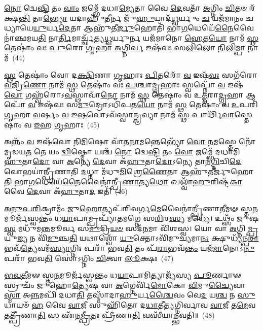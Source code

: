 \-\ul{𑌨𑍋} 𑌦𑍍𑌵𑍇\-\ul{𑌷𑍍𑌟𑌿} 𑌤𑌂 \ul{𑌵𑌾𑌂} 𑌜𑌮𑍍𑌭𑍇᳴ 𑌦𑌧𑌾\-\ul{𑌮𑍍𑌯𑍇}\-𑌤𑌾 𑌵𑍈 \ul{𑌦𑍇}\-𑌵𑌤𑌾᳴ \ul{𑌅}\-𑌗𑍍𑌨𑌿𑌂 \ul{𑌚𑌿}\-𑌤𑍞 𑌰᳴𑌕𑍍𑌷\-\ul{𑌨𑍍𑌤𑌿} 𑌤𑌾\-\ul{𑌭𑍍𑌯𑍋} 𑌯𑌦𑌾𑌹𑍁᳴\-\ul{𑌤𑍀}\-𑌰𑍍𑌨 𑌜𑍁᳴\-\ul{𑌹𑍁}\-𑌯𑌾𑌦᳴\-\ul{𑌧𑍍𑌵}\-𑌰𑍍𑌯𑍁𑌂 \ul{𑌚} 𑌯𑌜᳴𑌮𑌾𑌨𑌂 𑌚 𑌧𑍍𑌯𑌾𑌯𑍇\-\ul{𑌯𑍁}\-𑌰𑍍𑌯\-\ul{𑌦𑍇}\-𑌤𑌾 𑌆𑌹𑍁᳴𑌤𑍀\-\ul{𑌰𑍍𑌜𑍁}\-𑌹𑍋𑌤𑌿᳴ 𑌭𑌾\-\ul{𑌗}\-𑌧𑍇𑌯𑍇᳴\-\ul{𑌨𑍈}\-𑌵𑍈𑌨𑌾॑𑌞𑍍𑌛𑌮𑌯\-\ul{𑌤𑌿} 𑌨𑌾\-\ul{𑌰𑍍𑌤𑌿}\-𑌮𑌾𑌰𑍍𑌚𑍍𑌛᳴𑌤𑍍𑌯\-\ul{𑌧𑍍𑌵}\-𑌰𑍍𑌯𑍁𑌰𑍍𑌨 𑌯𑌜᳴𑌮𑌾𑌨𑍋 \ul{𑌹𑍇}\-𑌤\-\ul{𑌯𑍋} 𑌨𑌾𑌮᳴ \ul{𑌸𑍍𑌥} 𑌤𑍇𑌷𑌾𑌂॑ 𑌵𑌃 \ul{𑌪𑍁}\-𑌰𑍋 \ul{𑌗𑍃}\-𑌹𑌾 \ul{𑌅}\-𑌗𑍍𑌨𑌿\-\ul{𑌰𑍍𑌵} 𑌇𑌷᳴𑌵𑌃 𑌸\-\ul{𑌲𑌿}\-𑌲𑍋 𑌨𑌿\-\ul{𑌲𑌿}\-𑌮𑍍𑌪𑌾 𑌨𑌾𑌮᳴~(44)

\-\ul{𑌸𑍍𑌥} 𑌤𑍇𑌷𑌾𑌂॑ 𑌵𑍋 𑌦\-\ul{𑌕𑍍𑌷𑌿}\-𑌣𑌾 \ul{𑌗𑍃}\-𑌹𑌾𑌃 \ul{𑌪𑌿}\-𑌤𑌰𑍋᳴ \ul{𑌵} 𑌇𑌷᳴\-\ul{𑌵𑌃} 𑌸𑌗᳴𑌰𑍋 \ul{𑌵}\-𑌜𑍍𑌰𑌿\-\ul{𑌣𑍋} 𑌨𑌾𑌮᳴ \ul{𑌸𑍍𑌥} 𑌤𑍇𑌷𑌾𑌂॑ 𑌵𑌃 \ul{𑌪}\-𑌶𑍍𑌚𑌾\-\ul{𑌦𑍍𑌗𑍃}\-𑌹𑌾𑌃 𑌸𑍍𑌵𑌪𑍍𑌨𑍋᳴ \ul{𑌵} 𑌇𑌷᳴\-\ul{𑌵𑍋} 𑌗𑌹𑍍𑌵᳴𑌰𑍋\-𑌽\-\ul{𑌵}\-𑌸𑍍𑌥𑌾𑌵𑌾᳴\-\ul{𑌨𑍋} 𑌨𑌾𑌮᳴ \ul{𑌸𑍍𑌥} 𑌤𑍇𑌷𑌾𑌂॑ 𑌵 𑌉\-\ul{𑌤𑍍𑌤}\-𑌰𑌾\-\ul{𑌦𑍍𑌗𑍃}\-𑌹𑌾 𑌆𑌪𑍋᳴ \ul{𑌵} 𑌇𑌷᳴𑌵𑌃 𑌸\-\ul{𑌮𑍁}\-𑌦𑍍𑌰𑍋\-𑌽𑌧𑌿᳴𑌪𑌤\-\ul{𑌯𑍋} 𑌨𑌾𑌮᳴ \ul{𑌸𑍍𑌥} 𑌤𑍇𑌷𑌾𑌂॑ 𑌵 \ul{𑌉}\-𑌪𑌰𑌿᳴ \ul{𑌗𑍃}\-𑌹𑌾 \ul{𑌵}\-𑌰𑍍\mbox{}𑌷𑌂 \ul{𑌵} 𑌇\-\ul{𑌷}\-𑌵𑍋\-𑌽𑌵᳴𑌸𑍍𑌵𑌾\-\ul{𑌨𑍍𑌕𑍍𑌰}\-𑌵𑍍𑌯𑌾 𑌨𑌾𑌮᳴ \ul{𑌸𑍍𑌥} 𑌪𑌾𑌰𑍍𑌥𑌿᳴\-\ul{𑌵𑌾}\-𑌸𑍍𑌤𑍇𑌷𑌾𑌂॑ 𑌵 \ul{𑌇}\-𑌹 \ul{𑌗𑍃}\-𑌹𑌾𑌃~(45)

𑌅𑌨𑍍𑌨𑌂᳴ \ul{𑌵} 𑌇𑌷᳴𑌵𑍋 𑌨𑌿\-\ul{𑌮𑌿}\-𑌷𑍋 𑌵𑌾᳴𑌤\-\ul{𑌨𑌾}\-𑌮𑌨𑍍𑌤𑍇𑌭𑍍𑌯𑍋᳴ \ul{𑌵𑍋} 𑌨\-\ul{𑌮}\-𑌸𑍍𑌤𑍇 𑌨𑍋᳴ 𑌮𑍃𑌡𑌯\-\ul{𑌤} 𑌤𑍇 𑌯𑌂 \ul{𑌦𑍍𑌵𑌿}\-𑌷𑍍𑌮𑍋 𑌯𑌶𑍍𑌚᳴ \ul{𑌨𑍋} 𑌦𑍍𑌵𑍇\-\ul{𑌷𑍍𑌟𑌿} 𑌤𑌂 \ul{𑌵𑍋} 𑌜𑌮𑍍𑌭𑍇᳴ 𑌦𑌧𑌾𑌮𑌿 \ul{𑌹𑍁}\-𑌤𑌾\-\ul{𑌦𑍋} 𑌵𑌾 \ul{𑌅}\-𑌨𑍍𑌯𑍇 \ul{𑌦𑍇}\-𑌵𑌾 𑌅᳴\-\ul{𑌹𑍁}\-𑌤𑌾\-\ul{𑌦𑍋}\-\-𑌽𑌨𑍍𑌯𑍇 𑌤𑌾𑌨᳴\-\ul{𑌗𑍍𑌨𑌿}\-𑌚𑌿\-\ul{𑌦𑍇}\-𑌵𑍋𑌭𑌯𑌾॑𑌨𑍍𑌪𑍍𑌰𑍀𑌣𑌾𑌤𑌿 \ul{𑌦}\-𑌧𑍍𑌨𑌾 𑌮᳴𑌧𑍁\-\ul{𑌮𑌿}\-𑌶𑍍𑌰𑍇\-\ul{𑌣𑍈}\-𑌤𑌾 𑌆𑌹𑍁᳴𑌤𑍀𑌰𑍍𑌜𑍁𑌹𑍋𑌤𑌿 𑌭𑌾\-\ul{𑌗}\-𑌧𑍇𑌯𑍇᳴\-\ul{𑌨𑍈}\-𑌵𑍈𑌨𑌾॑𑌨𑍍𑌪𑍍𑌰𑍀\-\ul{𑌣𑌾}\-𑌤𑍍𑌯\-\ul{𑌥𑍋} 𑌖𑌲𑍍𑌵𑌾᳴\-\ul{𑌹𑍁}\-𑌰𑌿𑌷𑍍𑌟᳴\-\ul{𑌕𑌾} 𑌵𑍈 \ul{𑌦𑍇}\-𑌵𑌾 𑌅᳴\-\ul{𑌹𑍁}\-𑌤𑌾\-\ul{𑌦} 𑌇𑌤𑌿᳴~(46)

\-\ul{𑌅}\-\-\ul{𑌨𑍁}\-\-\ul{𑌪}\-\-\ul{𑌰𑌿}\-𑌕𑍍𑌰𑌾𑌮𑌂᳴ 𑌜𑍁\-\ul{𑌹𑍋}\-𑌤𑍍𑌯𑌪᳴𑌰𑌿𑌵𑌰𑍍𑌗\-\ul{𑌮𑍇}\-𑌵𑍈𑌨𑌾॑𑌨𑍍𑌪𑍍𑌰𑍀𑌣𑌾\-\ul{𑌤𑍀}\-𑌮𑍟 𑌸𑍍𑌤\-\ul{𑌨}\-𑌮𑍂𑌰𑍍𑌜᳴𑌸𑍍𑌵𑌨𑍍𑌤𑌂 𑌧\-\ul{𑌯𑌾}\-𑌪𑌾𑌮𑍍𑌪𑍍𑌰𑌪𑍍𑌯𑌾᳴𑌤𑌮𑌗𑍍𑌨𑍇 𑌸\-\ul{𑌰𑌿}\-𑌰\-\ul{𑌸𑍍𑌯} 𑌮𑌧𑍍𑌯𑍇॑। 𑌉𑌥𑍍𑌸𑌂᳴ 𑌜𑍁𑌷\-\ul{𑌸𑍍𑌵} 𑌮𑌧𑍁᳴𑌮𑌨𑍍𑌤𑌮𑍂𑌰𑍍𑌵 𑌸\-\ul{𑌮𑍁}\-𑌦𑍍𑌰𑌿\-\ul{𑌯}\-\-\ul{𑍞} 𑌸𑌦᳴\-\ul{𑌨}\-𑌮𑌾 𑌵𑌿᳴𑌶𑌸𑍍𑌵। 𑌯𑍋 𑌵𑌾 \ul{𑌅}\-𑌗𑍍𑌨𑌿\-\ul{𑌮𑍍𑌪𑍍𑌰}\-𑌯𑍁\-\ul{𑌜𑍍𑌯} 𑌨 𑌵𑌿᳴\-\ul{𑌮𑍁}\-𑌞𑍍𑌚\-\ul{𑌤𑌿} 𑌯𑌥𑌾𑌶𑍍𑌵𑍋᳴ \ul{𑌯𑍁}\-𑌕𑍍𑌤𑍋\-𑌽𑌵𑌿᳴𑌮𑍁𑌚𑍍𑌯𑌮𑌾\-\ul{𑌨𑌃} 𑌕𑍍𑌷𑍁𑌧𑍍𑌯᳴𑌨𑍍𑌪\-\ul{𑌰𑌾}\-𑌭𑌵᳴\-\ul{𑌤𑍍𑌯𑍇}\-𑌵𑌮᳴\-\ul{𑌸𑍍𑌯𑌾}\-𑌗𑍍𑌨𑌿𑌃 𑌪𑌰𑌾᳴ 𑌭𑌵\-\ul{𑌤𑌿} 𑌤𑌂 𑌪᳴\-\ul{𑌰𑌾}\-𑌭𑌵᳴\-\ul{𑌨𑍍𑌤𑌂} 𑌯𑌜᳴\-\ul{𑌮𑌾}\-𑌨𑍋\-𑌽\-\ul{𑌨𑍁} 𑌪𑌰𑌾᳴ 𑌭𑌵\-\ul{𑌤𑌿} 𑌸𑍋॑\-𑌽𑌗𑍍𑌨𑌿𑌂 \ul{𑌚𑌿}\-𑌤𑍍𑌵𑌾 \ul{𑌲𑍂}\-𑌕𑍍𑌷𑌃~(47)

\-\ul{𑌭}\-\-\ul{𑌵}\-\-\ul{𑌤𑍀}\-𑌮𑍟 𑌸𑍍𑌤\-\ul{𑌨}\-𑌮𑍂𑌰𑍍𑌜᳴𑌸𑍍𑌵𑌨𑍍𑌤𑌂 𑌧\-\ul{𑌯𑌾}\-𑌪𑌾𑌮𑌿𑌤𑍍𑌯𑌾𑌜𑍍𑌯᳴𑌸𑍍𑌯 \ul{𑌪𑍂}\-𑌰𑍍𑌣𑌾𑍟 𑌸𑍍𑌰𑍁𑌚𑌂᳴ 𑌜𑍁𑌹𑍋\-\ul{𑌤𑍍𑌯𑍇}\-𑌷 𑌵𑌾 \ul{𑌅}\-𑌗𑍍𑌨𑍇𑌰𑍍𑌵𑌿᳴\-\ul{𑌮𑍋}\-𑌕𑍋 \ul{𑌵𑌿}\-𑌮𑍁\-\ul{𑌚𑍍𑌯𑍈}\-𑌵𑌾\-\ul{𑌸𑍍𑌮𑌾} 𑌅\-\ul{𑌨𑍍𑌨}\-𑌮𑌪𑌿᳴ 𑌦𑌧𑌾\-\ul{𑌤𑌿} 𑌤𑌸𑍍𑌮𑌾᳴𑌦𑌾\-\ul{𑌹𑍁}\-𑌰𑍍𑌯\-\ul{𑌶𑍍𑌚𑍈}\-𑌵𑌂 𑌵𑍇\-\ul{𑌦} 𑌯\-\ul{𑌶𑍍𑌚} 𑌨 \ul{𑌸𑍁}\-𑌧𑌾𑌯𑍞᳴ \ul{𑌹} 𑌵𑍈 \ul{𑌵𑌾}\-𑌜𑍀 𑌸𑍁𑌹𑌿᳴𑌤𑍋 𑌦\-\ul{𑌧𑌾}\-𑌤𑍀\-\ul{𑌤𑍍𑌯}\-𑌗𑍍𑌨𑌿𑌰𑍍𑌵𑌾𑌵 \ul{𑌵𑌾}\-𑌜𑍀 𑌤\-\ul{𑌮𑍇}\-𑌵 𑌤𑌤𑍍𑌪𑍍𑌰𑍀᳴𑌣𑌾\-\ul{𑌤𑌿} 𑌸 𑌏᳴𑌨\-\ul{𑌮𑍍𑌪𑍍𑌰𑍀}\-𑌤𑌃 𑌪𑍍𑌰𑍀᳴𑌣𑌾\-\ul{𑌤𑌿} 𑌵𑌸𑍀᳴𑌯𑌾𑌨𑍍𑌭𑌵𑌤𑌿॥~(48)

